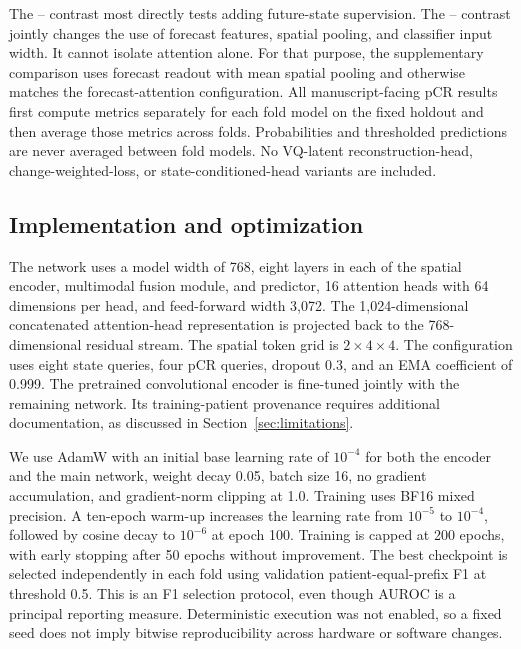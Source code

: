 The \direct{}--\nojepa{} contrast most directly tests adding future-state supervision. The \fullmodel{}--\direct{} contrast jointly changes the use of forecast features, spatial pooling, and classifier input width. It cannot isolate attention alone. For that purpose, the supplementary \meanmodel{} comparison uses forecast readout with mean spatial pooling and otherwise matches the forecast-attention configuration. All manuscript-facing pCR results first compute metrics separately for each fold model on the fixed holdout and then average those metrics across folds. Probabilities and thresholded predictions are never averaged between fold models. No VQ-latent reconstruction-head, change-weighted-loss, or state-conditioned-head variants are included.

\subsection{Implementation and optimization}
The network uses a model width of 768, eight layers in each of the spatial encoder, multimodal fusion module, and predictor, 16 attention heads with 64 dimensions per head, and feed-forward width 3,072. The 1,024-dimensional concatenated attention-head representation is projected back to the 768-dimensional residual stream. The spatial token grid is $2\times4\times4$. The configuration uses eight state queries, four pCR queries, dropout 0.3, and an EMA coefficient of 0.999. The pretrained convolutional encoder is fine-tuned jointly with the remaining network. Its training-patient provenance requires additional documentation, as discussed in Section~\ref{sec:limitations}.

We use AdamW \citep{adamw2019} with an initial base learning rate of $10^{-4}$ for both the encoder and the main network, weight decay 0.05, batch size 16, no gradient accumulation, and gradient-norm clipping at 1.0. Training uses BF16 mixed precision. A ten-epoch warm-up increases the learning rate from $10^{-5}$ to $10^{-4}$, followed by cosine decay to $10^{-6}$ at epoch 100. Training is capped at 200 epochs, with early stopping after 50 epochs without improvement. The best checkpoint is selected independently in each fold using validation patient-equal-prefix F1 at threshold 0.5. This is an F1 selection protocol, even though AUROC is a principal reporting measure. Deterministic execution was not enabled, so a fixed seed does not imply bitwise reproducibility across hardware or software changes.


